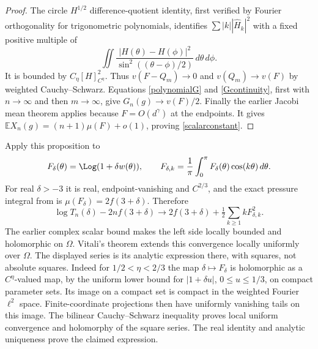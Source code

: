 \begin{proof}
The circle $H^{1/2}$ difference-quotient identity, first verified by
Fourier orthogonality for trigonometric polynomials, identifies
$\sum |k||\widehat H_k|^2$ with a fixed positive multiple of
\[
 \iint\frac{|H(\theta)-H(\phi)|^2}
                   {\sin^2((\theta-\phi)/2)}\,d\theta\,d\phi.
\]
It is bounded by $C_\eta[H]_{C^\eta}^2$. Thus $v(F-Q_m)\to0$ and
$v(Q_m)\to v(F)$ by weighted Cauchy--Schwarz. Equations
\eqref{polynomialG} and \eqref{Gcontinuity}, first with $n\to\infty$
and then $m\to\infty$, give $G_n(g)\to v(F)/2$.
Finally the earlier Jacobi mean theorem applies because
$F=O(d^\gamma)$ at the endpoints. It gives
$\mathbb EX_n(g)=(n+1)\mu(F)+o(1)$, proving
\eqref{scalarconstant}.
\end{proof}

Apply this proposition to
\[
 F_\delta(\theta)=\Log(1+\delta w(\theta)),\qquad
 F_{\delta,k}=\frac1\pi\int_0^\pi F_\delta(\theta)\cos(k\theta)\,d\theta.
\]
For real $\delta>-3$ it is real, endpoint-vanishing and $C^{2/3}$,
and the exact pressure integral from \cite[Section 9]{r124} is
$\mu(F_\delta)=2f(3+\delta)$. Therefore
\begin{equation}\label{scalarreallimit}
 \log T_n(\delta)-2nf(3+\delta)
 \longrightarrow 2f(3+\delta)+\tfrac12\sum_{k\ge1}kF_{\delta,k}^2.
\end{equation}
The earlier complex scalar bound makes the left side locally bounded
and holomorphic on $\Omega$. Vitali's theorem extends this convergence
locally uniformly over $\Omega$. The displayed series is its analytic
expression there, with squares, not absolute squares. Indeed for
$1/2<\eta<2/3$ the map $\delta\mapsto F_\delta$ is holomorphic
as a $C^\eta$-valued map, by the uniform lower bound for
$|1+\delta u|$, $0\le u\le1/3$, on compact parameter sets.
Its image on a compact set is compact in the weighted Fourier
$\ell^2$ space. Finite-coordinate projections then have uniformly
vanishing tails on this image. The bilinear Cauchy--Schwarz inequality
proves local uniform convergence and holomorphy of the square series.
The real identity and analytic uniqueness prove the claimed expression.

